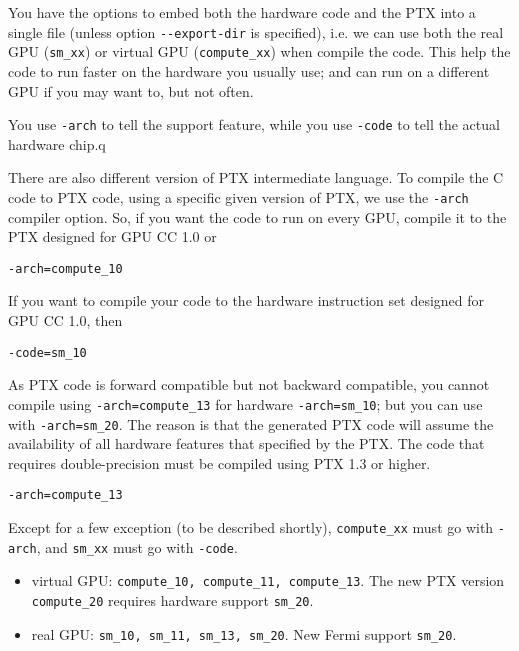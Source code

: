 You have the options to embed both the hardware code and the PTX into
a single file (unless option \verb!--export-dir! is specified),
i.e. we can use both the real GPU (\verb!sm_xx!) or virtual GPU
(\verb!compute_xx!) when compile the code. This help the code to run
faster on the hardware you usually use; and can run on a different GPU
if you may want to, but not often.

\begin{framed}
  You use \verb!-arch!  to tell the support feature, while you use
  \verb!-code! to tell the actual hardware chip.q
\end{framed}

There are also different version of PTX intermediate language. To
compile the C code to PTX code, using a specific given version of PTX,
we use the \verb!-arch! compiler option. So, if you want the code to
run on every GPU, compile it to the PTX designed for GPU CC 1.0 or
\begin{verbatim}
-arch=compute_10
\end{verbatim}
If you want to compile your code to the hardware instruction set
designed for GPU CC 1.0, then
\begin{verbatim}
-code=sm_10
\end{verbatim}


As PTX code is forward compatible but not backward compatible, you
cannot compile using \verb!-arch=compute_13! for hardware
\verb!-arch=sm_10!; but you can use with \verb!-arch=sm_20!. The
reason is that the generated PTX code will assume the availability of
all hardware features that specified by the PTX. The code that
requires double-precision must be compiled using PTX 1.3 or higher.
\begin{verbatim}
-arch=compute_13 
\end{verbatim}


Except for a few exception (to be described shortly),
\verb!compute_xx! must go with \verb!-arch!, and \verb!sm_xx! must go
with \verb!-code!.
\begin{itemize}
\item virtual GPU: \verb!compute_10, compute_11, compute_13!. The new
  PTX version \verb!compute_20! requires hardware support
  \verb!sm_20!.
\item real GPU: \verb!sm_10, sm_11, sm_13, sm_20!. New Fermi support
  \verb!sm_20!.
\end{itemize}


